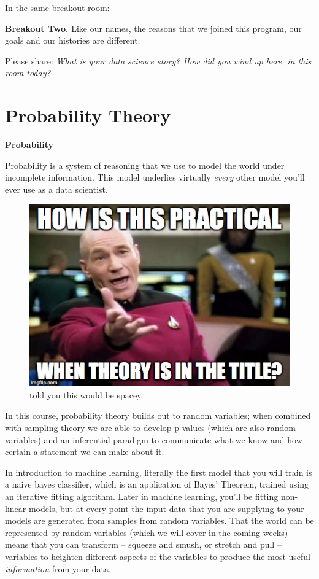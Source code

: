 \documentclass[
  letterpaper,
  DIV=11,
  numbers=noendperiod]{scrreprt}
\begin{document}
In the same breakout room:

\textbf{Breakout Two.} Like our names, the reasons that we joined this
program, our goals and our histories are different.

Please share: \emph{What is your data science story? How did you wind up
here, in this room today?}

\section{Probability Theory}\label{probability-theory}

\textbf{Probability}

Probability is a system of reasoning that we use to model the world
under incomplete information. This model underlies virtually
\emph{every} other model you'll ever use as a data scientist.

\begin{figure}[H]

{\centering \includegraphics{./images/picard.jpg}

}

\caption{told you this would be spacey}

\end{figure}%

In this course, probability theory builds out to random variables; when
combined with sampling theory we are able to develop p-values (which are
also random variables) and an inferential paradigm to communicate what
we know and how certain a statement we can make about it.

In introduction to machine learning, literally the first model that you
will train is a naive bayes classifier, which is an application of
Bayes' Theorem, trained using an iterative fitting algorithm. Later in
machine learning, you'll be fitting non-linear models, but at every
point the input data that you are supplying to your models are generated
from samples from random variables. That the world can be represented by
random variables (which we will cover in the coming weeks) means that
you can transform -- squeeze and smush, or stretch and pull -- variables
to heighten different aspects of the variables to produce the most
useful \emph{information} from your data.
\end{document}
